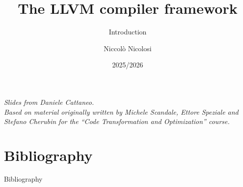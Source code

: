 

\author{Niccolò Nicolosi}
\date{2025/2026}
\title{The LLVM compiler framework}
\subtitle{Introduction}
\newcommand{\customdata}{Niccolò Nicolosi}






\begin{frame}
\maketitle
\begin{center}
\itshape\scriptsize
Slides from Daniele Cattaneo.\\
Based on material originally written by
Michele Scandale, Ettore Speziale and Stefano Cherubin for the
``Code Transformation and Optimization'' course.
\end{center}
\end{frame}









\section{Bibliography}
\begin{frame}[allowframebreaks]{Bibliography}
\nocite{*}


\end{frame}



